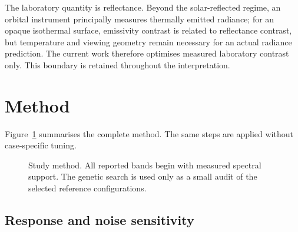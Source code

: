 \documentclass[a4paper,10pt,twocolumn]{article}
\begin{document}
The laboratory quantity is reflectance. Beyond the solar-reflected regime, an orbital instrument principally measures thermally emitted radiance; for an opaque isothermal surface, emissivity contrast is related to reflectance contrast, but temperature and viewing geometry remain necessary for an actual radiance prediction. The current work therefore optimises measured laboratory contrast only. This boundary is retained throughout the interpretation.

\section{Method}

Figure~\ref{fig:method} summarises the complete method. The same steps are applied without case-specific tuning.

\begin{figure}[t]
\centering
{}
\caption{Study method. All reported bands begin with measured spectral support. The genetic search is used only as a small audit of the selected reference configurations.}
\label{fig:method}
\end{figure}

\subsection{Response and noise sensitivity}
\end{document}
